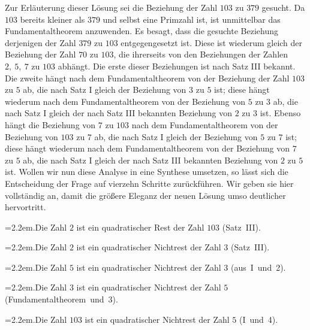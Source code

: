 
Zur Erläuterung dieser Lösung sei die Beziehung der Zahl $103$ zu $379$ gesucht. Da $103$ bereits kleiner als $379$ und selbst eine Primzahl ist, ist unmittelbar das Fundamentaltheorem anzuwenden. Es besagt, dass die gesuchte Beziehung derjenigen der Zahl $379$ zu $103$ entgegengesetzt ist. Diese ist wiederum gleich der Beziehung der Zahl $70$ zu $103$, die ihrerseits von den Beziehungen der Zahlen $2,\ 5,\ 7$ zu $103$ abhängt. Die erste dieser Beziehungen ist nach Satz III bekannt. Die zweite hängt nach dem Fundamentaltheorem von der Beziehung der Zahl $103$ zu $5$ ab, die nach Satz I gleich der Beziehung von $3$ zu $5$ ist; diese hängt wiederum nach dem Fundamentaltheorem von der Beziehung von $5$ zu $3$ ab, die nach Satz I gleich der nach Satz III bekannten Beziehung von $2$ zu $3$ ist. Ebenso hängt die Beziehung von $7$ zu $103$ nach dem Fundamentaltheorem von der Beziehung von $103$ zu $7$ ab, die nach Satz I gleich der Beziehung von $5$ zu $7$ ist; diese hängt wiederum nach dem Fundamentaltheorem von der Beziehung von $7$ zu $5$ ab, die nach Satz I gleich der nach Satz III bekannten Beziehung von $2$ zu $5$ ist. Wollen wir nun diese Analyse in eine Synthese umsetzen, so lässt sich die Entscheidung der Frage auf vierzehn Schritte zurückführen. Wir geben sie hier vollständig an, damit die größere Eleganz der neuen Lösung umso deutlicher hervortritt.

{\raggedright\hangindent=2.2em.\quad Die Zahl $2$ ist ein quadratischer Rest der Zahl $103$ \mbox{(Satz III)}.\par}

{\raggedright\hangindent=2.2em.\quad Die Zahl $2$ ist ein quadratischer Nichtrest der Zahl $3$ \mbox{(Satz III)}.\par}

{\raggedright\hangindent=2.2em.\quad Die Zahl $5$ ist ein quadratischer Nichtrest der Zahl $3$ \mbox{(aus I und 2)}.\par}

{\raggedright\hangindent=2.2em.\quad Die Zahl $3$ ist ein quadratischer Nichtrest der Zahl $5$ \mbox{(Fundamentaltheorem und 3)}.\par}

{\raggedright\hangindent=2.2em.\quad Die Zahl $103$ ist ein quadratischer Nichtrest der Zahl $5$ \mbox{(I und 4)}.\par}

